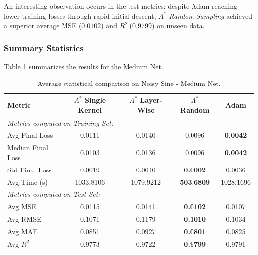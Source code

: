 An interesting observation occurs in the test metrics: despite Adam reaching lower training losses through rapid initial descent, \textit{$A^*$ Random Sampling} achieved a superior average MSE ($0.0102$) and $R^2$ ($0.9799$) on unseen data.
\subsubsection{Summary Statistics}

Table \ref{tab:medium_net_sine} summarizes the results for the Medium Net.

\begin{table}[htbp]
\centering
\scriptsize
\begin{tabular}{|l|c|c|c|c|}
\hline
\textbf{Metric}   & \textbf{$A^*$ Single Kernel} & \textbf{$A^*$ Layer-Wise} & \textbf{$A^*$ Random} & \textbf{Adam} \\ \hline
\multicolumn{5}{|l|}{\textit{Metrics computed on Training Set:}} \\ \hline
Avg Final Loss          & 0.0111                       & 0.0140                    & 0.0096                & \textbf{0.0042} \\ 
Median Final Loss       & 0.0103                       & 0.0136                    & 0.0096                & \textbf{0.0042} \\
Std Final Loss          & 0.0019                       & 0.0040                    & \textbf{0.0002}       & 0.0036        \\ \hline
Avg Time (s)            & 1033.8106                    & 1079.9212                 & \textbf{503.6809}     & 1028.1696     \\ \hline
\multicolumn{5}{|l|}{\textit{Metrics computed on Test Set:}} \\ \hline
Avg MSE                 & 0.0115                       & 0.0141                    & \textbf{0.0102}       & 0.0107        \\ 
Avg RMSE                & 0.1071                       & 0.1179                    & \textbf{0.1010}       & 0.1034        \\ 
Avg MAE                 & 0.0851                       & 0.0927                    & \textbf{0.0801}       & 0.0825        \\ 
Avg $R^2$               & 0.9773                       & 0.9722                    & \textbf{0.9799}       & 0.9791        \\ \hline
\end{tabular}
\caption{Average statistical comparison on Noisy Sine - Medium Net.}
\label{tab:medium_net_sine}
\end{table}

